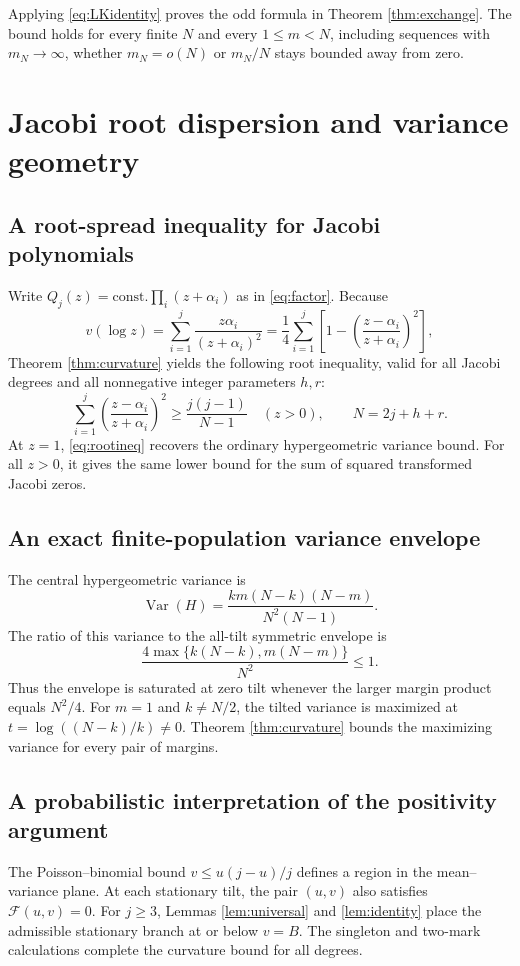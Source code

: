 \documentclass[11pt,a4paper]{article}
\DeclareMathOperator{\Var}{Var}\DeclareMathOperator{\Cov}{Cov}\DeclareMathOperator{\Hyp}{Hyp}\DeclareMathOperator{\Bern}{Bern}\DeclareMathOperator{\supp}{supp}\DeclareMathOperator{\artanh}{artanh}
\begin{document}
Applying \eqref{eq:LKidentity} proves the odd formula in Theorem \ref{thm:exchange}. The bound holds for every finite $N$ and every $1\le m<N$, including sequences with $m_N\to\infty$, whether $m_N=o(N)$ or $m_N/N$ stays bounded away from zero.


\section{Jacobi root dispersion and variance geometry}\label{sec:structure}
\subsection{A root-spread inequality for Jacobi polynomials}
Write $Q_j(z)=\text{const.}\prod_i(z+\alpha_i)$ as in \eqref{eq:factor}. Because
\[
 v(\log z)=\sum_{i=1}^j\frac{z\alpha_i}{(z+\alpha_i)^2}
 =\frac14\sum_{i=1}^j\left[1-\left(\frac{z-\alpha_i}{z+\alpha_i}\right)^2\right],
\]
Theorem \ref{thm:curvature} yields the following root inequality, valid for all Jacobi degrees and all nonnegative integer parameters $h,r$:
\begin{equation}\label{eq:rootineq}
 \boxed{\quad
 \sum_{i=1}^j\left(\frac{z-\alpha_i}{z+\alpha_i}\right)^2
 \ge\frac{j(j-1)}{N-1}
 \quad(z>0),\qquad N=2j+h+r.\quad}
\end{equation}
At $z=1$, \eqref{eq:rootineq} recovers the ordinary hypergeometric variance bound. For all $z>0$, it gives the same lower bound for the sum of squared transformed Jacobi zeros.

\subsection{An exact finite-population variance envelope}
The central hypergeometric variance is
\[
 \Var(H)=\frac{km(N-k)(N-m)}{N^2(N-1)}.
\]
The ratio of this variance to the all-tilt symmetric envelope is
\[
 \frac{4\max\{k(N-k),m(N-m)\}}{N^2}\le1.
\]
Thus the envelope is saturated at zero tilt whenever the larger margin product equals $N^2/4$. For $m=1$ and $k\ne N/2$, the tilted variance is maximized at $t=\log((N-k)/k)\ne0$. Theorem \ref{thm:curvature} bounds the maximizing variance for every pair of margins.

\subsection{A probabilistic interpretation of the positivity argument}
The Poisson--binomial bound $v\le u(j-u)/j$ defines a region in the mean--variance plane. At each stationary tilt, the pair $(u,v)$ also satisfies $\mathcal F(u,v)=0$. For $j\ge3$, Lemmas \ref{lem:universal} and \ref{lem:identity} place the admissible stationary branch at or below $v=B$. The singleton and two-mark calculations complete the curvature bound for all degrees.
\end{document}
